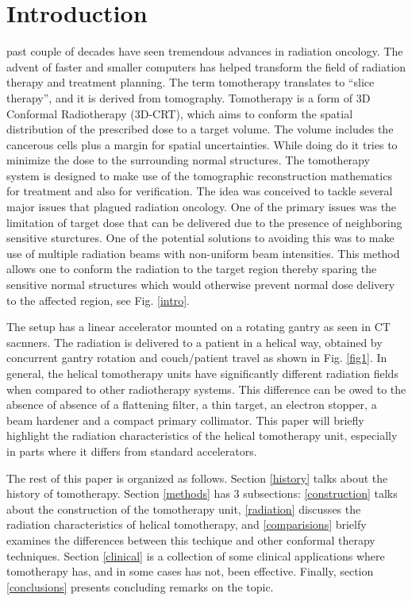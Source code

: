 \documentclass[10pt,journal,compsoc]{IEEEtran} %
\begin{document}
  \section{Introduction}
	 past couple of decades have seen tremendous advances in 
	radiation oncology. The advent of faster and smaller computers has helped 
	transform the field of radiation therapy and treatment planning. The term 
	tomotherapy translates to ``slice therapy'', and it is derived from 
	tomography. Tomotherapy is a form of 3D Conformal Radiotherapy (3D-CRT), 
  which aims to conform the spatial distribution of the prescribed dose to a 
  target volume. The volume includes the cancerous cells plus a margin for 
  spatial uncertainties. While doing do it tries to minimize the dose to the
  surrounding normal structures. The tomotherapy system is designed to make use 
  of the tomographic 	reconstruction mathematics for treatment and also for 
  verification. The idea 	was conceived to tackle several major issues that 
  plagued radiation oncology. One of the primary issues was the limitation of 
  target dose that can be 	delivered due to the presence of neighboring 
  sensitive sturctures. One of the 	potential solutions to avoiding this was 
  to make use of multiple radiation 	beams with non-uniform beam intensities. 
  This method allows one to conform 	the radiation to the target region 
  thereby   sparing the sensitive normal 	structures which would otherwise 
  prevent   normal dose delivery to the affected 	region, see Fig. \ref{intro}.
  
  The setup has a 
  linear accelerator mounted on a rotating gantry as seen in CT 
  sacnners. The radiation is delivered to a patient in a helical way, obtained 
  by concurrent gantry rotation and couch/patient travel as shown in Fig. 
  \ref{fig1}. In general, the helical tomotherapy units have significantly 
  different radiation fields when compared to other radiotherapy systems. This 
  difference can be owed to the absence of absence of a flattening filter, a 
  thin target, an electron stopper, a beam hardener and a compact primary 
  collimator. This paper will briefly highlight the 
  radiation characteristics of the helical tomotherapy unit, especially in 
  parts where it differs from standard accelerators.
  
  The rest of this paper is 
  organized as follows. Section \ref{history} talks 
  about the history of tomotherapy. Section \ref{methods} has 3 subsections: 
  \ref{construction} talks about the construction of the tomotherapy unit, 
  \ref{radiation} discusses the radiation characteristics of helical 
  tomotherapy, and \ref{comparisions} brielfy examines the differences between 
  this techique and other conformal therapy techniques. Section \ref{clinical} 
  is a collection of some clinical applications where tomotherapy 
  has, and in some cases has not,  been effective. Finally, section 
  \ref{conclusions} presents concluding 
  remarks on the topic. 
  
\end{document}
